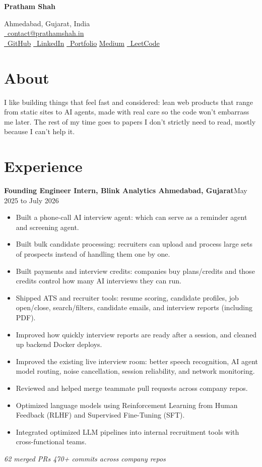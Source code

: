 \documentclass[10pt,letterpaper]{article}
\makeatletter
\newcommand{\resumename}[1]{%
  \vspace*{-12pt}
  \begin{center}
    {\LARGE\bfseries #1}
  \end{center}
  \vspace{-8pt}
}
\newcommand{\resumecontact}{%
  \begin{center}
    \small
    Ahmedabad, Gujarat, India \\[1pt]
    \href{mailto:contact@prathamshah.in}{\faIcon{envelope}~contact@prathamshah.in} \\[0pt]
    \href{https://github.com/pratham-commits}{\faGithub~GitHub}
    \enspace\textbar\enspace
    \href{https://www.linkedin.com/in/prathamm-shahh}{\faLinkedin~LinkedIn}
    \enspace\textbar\enspace
    \href{https://prathamshah.in}{\faIcon{globe}~Portfolio}
    \enspace\textbar\enspace
    \href{https://medium.com/@prathamsshah724}{Medium}
    \enspace\textbar\enspace
    \href{https://leetcode.com/u/cheesy7/}{\faIcon{code}~LeetCode}
  \end{center}
  \vspace{-2pt}
}
\newcommand{\resumeSubheading}[2]{%
  \textbf{#1}\hfill\small #2\par\vspace{0pt}
}
\makeatother
\begin{document}
\resumename{Pratham Shah}
\resumecontact

\section{About}
\small
I like building things that feel fast and considered: lean web products that range from static sites to AI agents, made with real care so the code won't embarrass me later. The rest of my time goes to papers I don't strictly need to read, mostly because I can't help it.

\section{Experience}
\resumeSubheading{Founding Engineer Intern, Blink Analytics \textendash{} Ahmedabad, Gujarat}{May 2025 to July 2026}
\begin{itemize}[leftmargin=*, nosep, topsep=0pt, itemsep=0pt, parsep=0pt]
  \item Built a phone-call AI interview agent: which can serve as a reminder agent and screening agent.
  \item Built bulk candidate processing: recruiters can upload and process large sets of prospects instead of handling them one by one.
  \item Built payments and interview credits: companies buy plans/credits and those credits control how many AI interviews they can run.
  \item Shipped ATS and recruiter tools: resume scoring, candidate profiles, job open/close, search/filters, candidate emails, and interview reports (including PDF).
  \item Improved how quickly interview reports are ready after a session, and cleaned up backend Docker deploys.
  \item Improved the existing live interview room: better speech recognition, AI agent model routing, noise cancellation, session reliability, and network monitoring.
  \item Reviewed and helped merge teammate pull requests across  company repos.
  \item Optimized language models using Reinforcement Learning from Human Feedback (RLHF) and Supervised Fine-Tuning (SFT).
  \item Integrated optimized LLM pipelines into internal recruitment tools with cross-functional teams.
\end{itemize}
\small\textit{62 merged PRs \textperiodcentered{} 470+ commits across  company repos}
\end{document}
